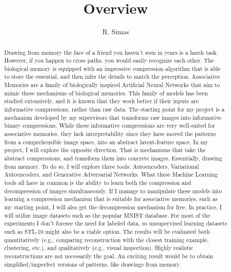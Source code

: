 \documentclass{article}
\title{Overview}
\author{R. Simas }
\begin{document}
\maketitle

\begin{abstract}
Drawing from memory the face of a friend you haven't seen in years is a harsh task. However, if you happen to cross paths, you would easily recognize each other.
The biological memory is equipped with an impressive compression algorithm that is able to store the essential, and then infer the details to match the perception.
Associative Memories are a family of biologically inspired Artificial Neural Networks that aim to mimic these mechanisms of biological memories.
This family of models has been studied extensively, and it is known that they work better if their inputs are informative compressions, rather than raw data.
The starting point for my project is a mechanism developed by my supervisors that transforms raw images into informative binary compressions.
While these informative compressions are very well-suited for associative memories, they lack interpretability since they have moved the patterns from a comprehensible image space, into an abstract latent-feature space.
In my project, I will explore the opposite direction. That is mechanisms that take the abstract compressions, and transform them into concrete images. Essentially, drawing from memory. 
To do so, I will explore three tools: Autoencoders, Variational Autoencoders, and Generative Adversarial Networks. What these Machine Learning tools all have in common is the ability to learn both the compression and decompression of images simultaneously. If I manage to manipulate these models into learning a compression mechanism that is suitable for associative memories, such as my starting point, I will also get the decompression mechanism for free.
In practice, I will utilize image datasets such as the popular MNIST database. For most of the experiments I don't foresee the need for labeled data, so unsupervised learning datasets such as STL-10 might also be a viable option.
The results will be evaluated both quantitatively (e.g., comparing reconstruction with the closest training example, clustering, etc.), and qualitatively (e.g., visual inspection). Highly realistic reconstructions are not necessarily the goal. An exciting result would be to obtain simplified/imperfect versions of patterns, like drawings from memory.

\end{abstract}
\end{document}
